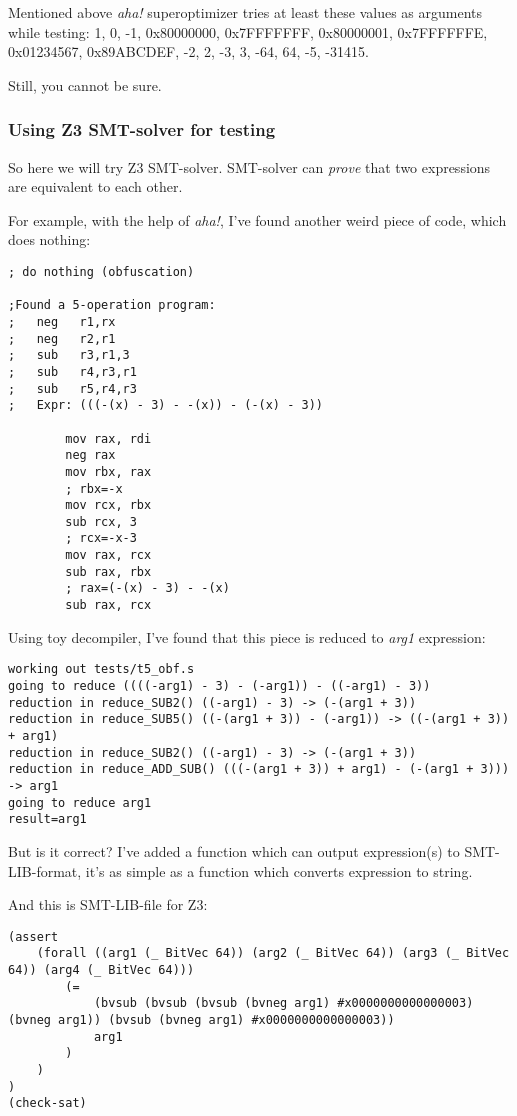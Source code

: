 Mentioned above \textit{aha!} superoptimizer tries at least these values as arguments while testing:
1, 0, -1, 0x80000000, 0x7FFFFFFF, 0x80000001, 0x7FFFFFFE, 0x01234567, 0x89ABCDEF, -2, 2, -3, 3,
-64, 64, -5, -31415.

Still, you cannot be sure.

\subsubsection{Using Z3 SMT-solver for testing}

So here we will try Z3 SMT-solver.
SMT-solver can \textit{prove} that two expressions are equivalent to each other.

For example, with the help of \textit{aha!}, I've found another weird piece of code, which does nothing:

\begin{lstlisting}
; do nothing (obfuscation)

;Found a 5-operation program:
;   neg   r1,rx
;   neg   r2,r1
;   sub   r3,r1,3
;   sub   r4,r3,r1
;   sub   r5,r4,r3
;   Expr: (((-(x) - 3) - -(x)) - (-(x) - 3))

        mov rax, rdi
        neg rax
        mov rbx, rax
        ; rbx=-x
        mov rcx, rbx
        sub rcx, 3
        ; rcx=-x-3
        mov rax, rcx
        sub rax, rbx
        ; rax=(-(x) - 3) - -(x)
        sub rax, rcx
\end{lstlisting}

Using toy decompiler, I've found that this piece is reduced to \textit{arg1} expression:

\begin{lstlisting}
working out tests/t5_obf.s
going to reduce ((((-arg1) - 3) - (-arg1)) - ((-arg1) - 3))
reduction in reduce_SUB2() ((-arg1) - 3) -> (-(arg1 + 3))
reduction in reduce_SUB5() ((-(arg1 + 3)) - (-arg1)) -> ((-(arg1 + 3)) + arg1)
reduction in reduce_SUB2() ((-arg1) - 3) -> (-(arg1 + 3))
reduction in reduce_ADD_SUB() (((-(arg1 + 3)) + arg1) - (-(arg1 + 3))) -> arg1
going to reduce arg1
result=arg1
\end{lstlisting}

But is it correct?
I've added a function which can output expression(s) to SMT-LIB-format, it's as simple as a function which converts
expression to string.

And this is SMT-LIB-file for Z3:

\begin{lstlisting}
(assert
    (forall ((arg1 (_ BitVec 64)) (arg2 (_ BitVec 64)) (arg3 (_ BitVec 64)) (arg4 (_ BitVec 64)))
        (=
            (bvsub (bvsub (bvsub (bvneg arg1) #x0000000000000003) (bvneg arg1)) (bvsub (bvneg arg1) #x0000000000000003))
            arg1
        )
    )
)
(check-sat)
\end{lstlisting}

